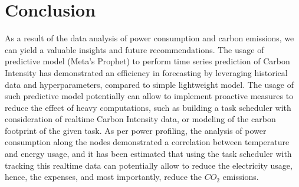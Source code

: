 \section{Conclusion}
\noindent

As a result of the data analysis of power consumption and carbon emissions, we can yield a valuable insights and future recommendations.
The usage of predictive model (Meta’s Prophet) to perform time series prediction of Carbon Intensity has demonstrated an efficiency in forecasting by leveraging historical data and hyperparameters, compared to simple lightweight model.
The usage of such predictive model potentially can allow to implement proactive measures to reduce the effect of heavy computations, such as building a task scheduler with consideration of realtime Carbon Intensity data, or modeling of the carbon footprint of the given task.
As per power profiling, the analysis of power consumption along the nodes demonstrated a correlation between temperature and energy usage, and it has been estimated that using the task scheduler with tracking this realtime data  can potentially allow to reduce the electricity usage, hence, the expenses, and most importantly, reduce the $CO_2$ emissions.